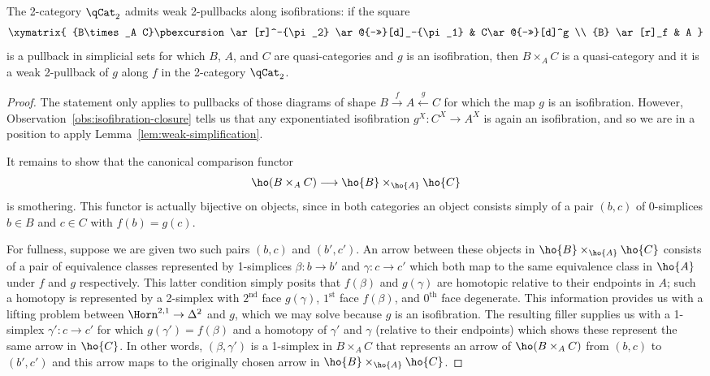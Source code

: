 \begin{prop}\label{prop:weak-homotopy-pullbacks} The 2-category $\qCat_2$ admits weak 2-pullbacks along isofibrations: if the square
\begin{equation*}
  \xymatrix{
    {B\times_A C}\pbexcursion\ar[r]^-{\pi_2} \ar@{->>}[d]_-{\pi_1} 
    &  C\ar@{->>}[d]^g \\
    {B} \ar[r]_f & A
  }
\end{equation*}
is a pullback in simplicial sets for which $B$, $A$, and $C$ are quasi-categories and $g$ is an isofibration, then $B\times_A C$ is a quasi-category and it is a weak 2-pullback of $g$ along $f$ in the 2-category $\qCat_2$.
\end{prop}

\begin{proof}
  The statement only applies to pullbacks of those diagrams of shape $B\xrightarrow{f} A \xleftarrow{g} C$ for which the map $g$ is an isofibration. However, Observation~\ref{obs:isofibration-closure} tells us that any exponentiated isofibration $g^X\colon C^X\to A^X$ is again an isofibration, and so we are in a position to apply Lemma~\ref{lem:weak-simplification}.

   It remains to show that the canonical comparison functor
  \begin{equation*}
    \ho(B\times_A C)\longrightarrow \ho{B}\times_{\ho{A}} \ho{C}
  \end{equation*}
  is smothering. This functor is actually bijective on objects, since in both categories an object consists simply of a pair $(b,c)$ of 0-simplices $b\in B$ and $c\in C$ with $f(b)=g(c)$. 
  
  For fullness, suppose we are given two such pairs $(b,c)$ and $(b',c')$. An arrow between these objects in $\ho{B} \times_{\ho{A}} \ho{C}$ consists of a pair of equivalence classes represented by 1-simplices $\beta \colon b \to b'$ and $\gamma \colon c \to c'$ which both map to the same equivalence class in $\ho{A}$ under $f$ and $g$ respectively. This latter condition simply posits that $f(\beta)$ and $g(\gamma)$ are homotopic relative to their endpoints in $A$; such a homotopy is represented by a 2-simplex with $2^{\text{nd}}$ face $g(\gamma)$, $1^{\text{st}}$ face $f(\beta)$, and $0^{\text{th}}$ face degenerate. This information provides us with a lifting problem between $\Horn^{2,1} \to \Delta^2$ and $g$, which we may solve because $g$ is an isofibration. The resulting filler supplies us with a 1-simplex $\gamma' \colon c \to c'$ for which $g(\gamma')=f(\beta)$ and a homotopy of $\gamma'$ and $\gamma$ (relative to their endpoints) which shows these represent the same arrow in $\ho{C}$. In other words, $(\beta,\gamma')$ is a 1-simplex in $B\times_A C$ that represents an arrow of $\ho(B\times_A C)$ from $(b,c)$ to $(b',c')$ and this arrow maps to the originally chosen arrow in $\ho{B}\times_{\ho{A}}\ho{C}$.


\end{proof}
